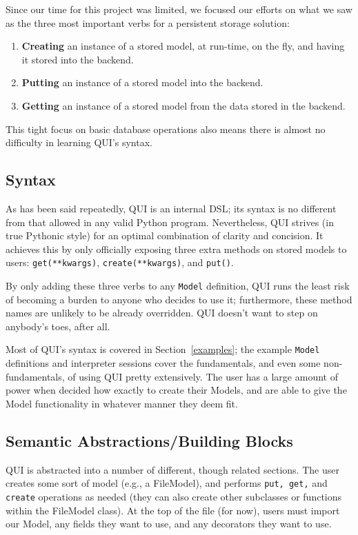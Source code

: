 \documentclass{article} %
\newcommand{\il}[1]{\mbox{\lstinline{#1}}}
\begin{document}
Since our time for this project was limited, we focused our efforts on what we saw as the three most important verbs for a persistent storage solution:
\begin{enumerate}
\item \textbf{Creating} an instance of a stored model, at run-time, on the fly, and having it stored into the backend.
\item \textbf{Putting} an instance of a stored model into the backend.
\item \textbf{Getting} an instance of a stored model from the data stored in the backend.
\end{enumerate}
This tight focus on basic database operations also means there is almost no difficulty in learning QUI's syntax.

\subsection{Syntax}
As has been said repeatedly, QUI is an internal DSL; its syntax is no different from that allowed in any valid Python program. 
Nevertheless, QUI strives (in true Pythonic style) for an optimal combination of clarity and concision. It achieves this by only officially 
exposing three extra methods on stored models to users: \il{get(**kwargs)}, \il{create(**kwargs)}, and \il{put()}.

By only adding these three verbs to any \il{Model} definition, QUI runs the least risk of becoming a burden to anyone who decides to use
it; furthermore, these method names are unlikely to be already overridden. QUI doesn't want to step on anybody's toes, after all. 

Most of QUI's syntax is covered in Section~\ref{examples}; the example \il{Model} definitions and interpreter sessions cover the fundamentals,
and even some non-fundamentals, of using QUI pretty extensively. The user has a large amount of power when decided how exactly to create their
Models, and are able to give the Model functionality in whatever manner they deem fit.

\subsection{Semantic Abstractions/Building Blocks}
QUI is abstracted into a number of different, though related sections. The user creates some sort of model (e.g., a FileModel), and performs \il{put, get,} and \il{create} operations as needed (they can also create other subclasses or functions within the FileModel class). At the top of the file (for now), users must import
our Model, any fields they want to use, and any decorators they want to use. 
\end{document}
